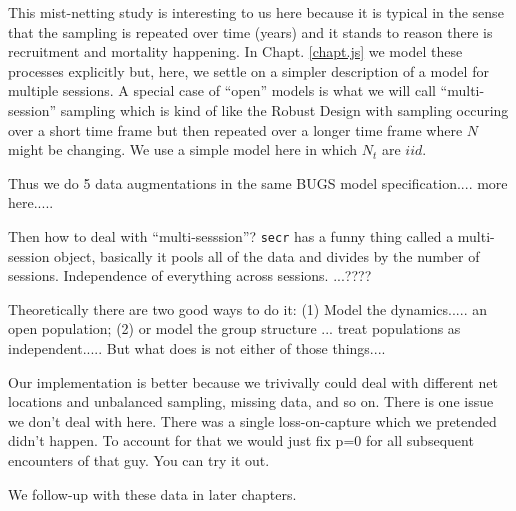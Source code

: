 This mist-netting study is interesting to us here because it is typical in the
sense that the sampling is repeated over time (years) and it stands to
reason there is recruitment and mortality happening. In
Chapt. \ref{chapt.js} we model these processes explicitly but, here,
we settle on a simpler description of a model for multiple sessions.
A special case of ``open'' models is what we will call
``multi-session'' sampling which is kind of like the Robust Design
with sampling occuring over a short time frame but then repeated over
a longer time frame where $N$ might be changing.  We use a simple
model here in which $N_{t}$ are $iid$.

Thus we do 5 data augmentations in the same BUGS model
specification.... more here.....

Then how to deal with ``multi-sesssion''? \mbox{\tt secr} has a funny thing
called a multi-session object, basically it pools all of the data and
divides by the number of sessions. Independence of everything across
sessions. ...????

Theoretically there are two good ways to do it:  (1) Model the
dynamics..... an open population; (2) or model the group structure
... treat populations as independent.....
But what \secr does is not either of those things....

Our implementation is better because we trivivally could deal with
different net locations and unbalanced sampling, missing data, and so
on. There is one issue we don't deal with here. There was a single
loss-on-capture which we pretended didn't happen. To account for that
we would just fix p=0 for all subsequent encounters of that guy. You
can try it out.

We follow-up with these data in later chapters.











